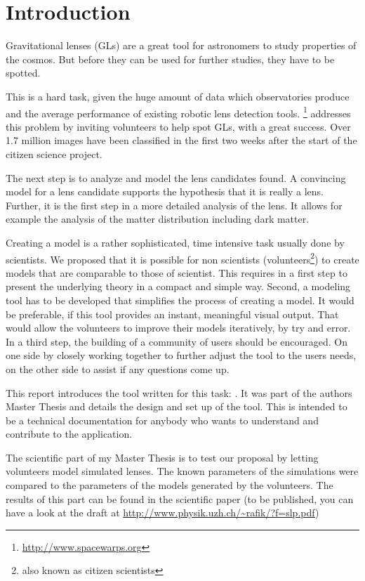 \section{Introduction}

Gravitational lenses (GLs) are a great tool for astronomers to study properties of the cosmos.
But before they can be used for further studies, they have to be spotted.

This is a hard task, given the huge amount of data which observatories produce and the average performance of existing robotic lens detection tools.
\sw\footnote{\protect\url{http://www.spacewarps.org}} addresses this problem by inviting volunteers to help spot GLs, with a great success.
Over 1.7 million images have been classified in the first two weeks after the start of the citizen science project.

The next step is to analyze and model the lens candidates found.
A convincing model for a lens candidate supports the hypothesis that it is really a lens. Further, it is the first step in a more detailed analysis of the lens.
It allows for example the analysis of the matter distribution including dark matter.

Creating a model is a rather sophisticated, time intensive task usually done by scientists.
We proposed that it is possible for non scientists (volunteers\footnote{also known as citizen scientists}) to create models that are comparable to those of scientist. This requires in a first step to present the underlying theory in a compact and simple way.
Second, a modeling tool has to be developed that simplifies the process of creating a model.
It would be preferable, if this tool provides an instant, meaningful visual output.
That would allow the volunteers to improve their models iteratively, by try and error.
In a third step, the building of a community of users should be encouraged.
On one side by closely working together to further adjust the tool to the users needs, on the other side to assist if any questions come up.


This report introduces the tool written for this task: \spl.
It was part of the authors Master Thesis and details the design and set up of the tool.
This is intended to be a technical documentation for anybody who wants to understand and contribute to the application.

The scientific part of my Master Thesis is to test our proposal by letting volunteers model simulated lenses.
The known parameters of the simulations were compared to the parameters of the models generated by the volunteers.
The results of this part can be found in the scientific paper (to be published, you can have a look at the draft at \url{http://www.physik.uzh.ch/~rafik/?f=slp.pdf})

